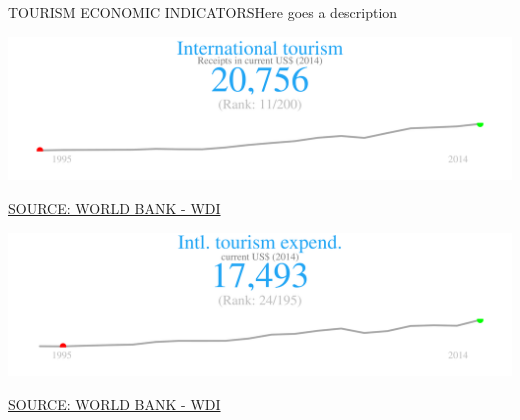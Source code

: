 \documentclass{article}\usepackage[]{graphicx}\usepackage[]{color}
\makeatletter
\def\maxwidth{ %
  \ifdim\Gin@nat@width>\linewidth
    \linewidth
  \else
    \Gin@nat@width
  \fi
}
\makeatother
\begin{document}
\begin{minipage}[c]{0.95\textwidth}
  \vspace{5ex}
  \begin{flushleft}  
    \hspace{4ex}\Large{\textcolor[HTML]{722FF5}{TOURISM ECONOMIC INDICATORS}}\hspace{2ex}\small{\textcolor[HTML]{818181} {Here goes a description}}
  \end{flushleft} 
  \begin{minipage}[c]{0.5\textwidth}
  \hspace{4ex}\small{\textcolor[HTML]{818181}{}}
    \vspace{1ex}


{\centering \includegraphics[width=\maxwidth]{figure/spark1-1} 

}



  \hspace{4ex}\scriptsize{\href{NA}{\textcolor[HTML]{722FF5}{SOURCE: WORLD BANK - WDI}}}
  \end{minipage}
  \begin{minipage}[c]{0.5\textwidth}
  \hspace{4ex}\small{\textcolor[HTML]{818181}{}}
    \vspace{1ex}


{\centering \includegraphics[width=\maxwidth]{figure/spark2-1} 

}



  \hspace{4ex}\scriptsize{\href{NA}{\textcolor[HTML]{722FF5}{SOURCE: WORLD BANK - WDI}}}
  \end{minipage}
\end{minipage}
\end{document}
